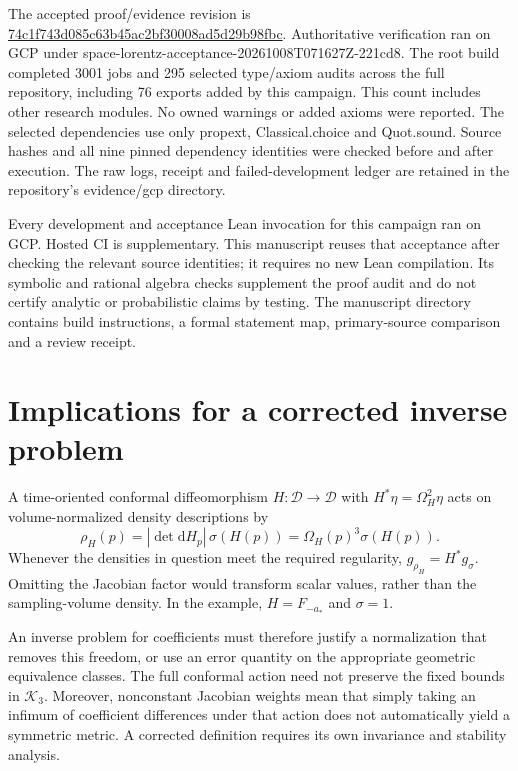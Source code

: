 \documentclass[11pt]{article}
\theoremstyle{remark}
\newcommand{\D}{\mathcal D}
\newcommand{\K}{\mathcal K_3}
\newcommand{\dd}{\mathrm d}
\newcommand{\code}[1]{{\small\ttfamily\def\_{\textunderscore\allowbreak}#1}}
\begin{document}
The accepted proof/evidence revision is
\href{https://github.com/Quantyra/quantyra-null-cone-lean/tree/74c1f743d085c63b45ac2bf30008ad5d29b98fbc}{\code{74c1f743d085c63b45ac2bf30008ad5d29b98fbc}}.
Authoritative verification ran on GCP under
\code{space-lorentz-acceptance-20261008T071627Z-221cd8}.
The root build completed 3001 jobs and 295 selected type/axiom audits
across the full repository, including 76 exports added by this campaign.
This count includes other research modules. No owned warnings or added
axioms were reported. The selected dependencies use only
\code{propext}, \code{Classical.choice} and \code{Quot.sound}.
Source hashes and all nine pinned dependency identities were checked
before and after execution. The raw logs, receipt and failed-development
ledger are retained in the repository's \code{evidence/gcp} directory.

Every development and acceptance Lean invocation for this campaign ran
on GCP. Hosted CI is supplementary. This manuscript reuses that acceptance
after checking the relevant source identities; it requires no new Lean
compilation. Its symbolic and rational algebra checks supplement the
proof audit and do not certify analytic or probabilistic claims by testing.
The manuscript directory contains build instructions, a formal statement
map, primary-source comparison and a review receipt.

\section{Implications for a corrected inverse problem}
A time-oriented conformal diffeomorphism $H:\D\to\D$ with
$H^*\eta=\Omega_H^2\eta$ acts on volume-normalized density descriptions
by
\begin{equation}\label{eq:gauge-action}
 \rho_H(p)=|\det\dd H_p|\,\sigma(H(p))
          =\Omega_H(p)^3\sigma(H(p)).
\end{equation}
Whenever the densities in question meet the required regularity,
$g_{\rho_H}=H^*g_\sigma$. Omitting the Jacobian factor would transform
scalar values, rather than the sampling-volume density. In the example,
$H=F_{-a_*}$ and $\sigma=1$.

An inverse problem for coefficients must therefore justify a normalization
that removes this freedom, or use an error quantity on the appropriate
geometric equivalence classes. The full conformal action need not preserve
the fixed bounds in $\K$. Moreover, nonconstant Jacobian weights mean
that simply taking an infimum of coefficient differences under that
action does not automatically yield a symmetric metric. A corrected
definition requires its own invariance and stability analysis.
\end{document}
